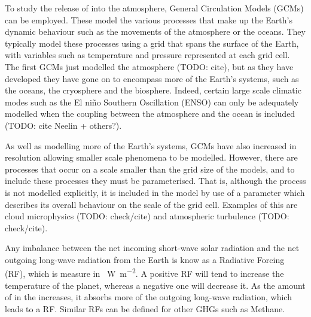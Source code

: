 \documentclass{article}
\newif\ifsubsection
\begin{document}
\ifsubsection
\subsection{General Circulation Models}
\fi
To study the release of  into the atmosphere, General Circulation Models (GCMs) can be employed. These model the various processes that make up the Earth's dynamic behaviour such as the movements of the atmosphere or the oceans. They typically model these processes using a grid that spans the surface of the Earth, with variables such as temperature and pressure represented at each grid cell. The first GCMs just modelled the atmosphere (TODO: cite), but as they have developed they have gone on to encompass more of the Earth's systems, such as the oceans, the cryosphere and the biosphere. Indeed, certain large scale climatic modes such as the El ni{\~n}o Southern Oscillation (ENSO) can only be adequately modelled when the coupling between the atmosphere and the ocean is included (TODO: cite Neelin + others?). 

As well as modelling more of the Earth's systems, GCMs have also increased in resolution allowing smaller scale phenomena to be modelled. However, there are processes that occur on a scale smaller than the grid size of the models, and to include these processes they must be parameterised. That is, although the process is not modelled explicitly, it is included in the model by use of a parameter which describes its overall behaviour on the scale of the grid cell. Examples of this are cloud microphysics (TODO: check/cite) and atmospheric turbulence (TODO: check/cite).

\ifsubsection
\subsection{Radiative forcing and feedbacks}
\fi
Any imbalance between the net incoming short-wave solar radiation and the net outgoing long-wave radiation from the Earth is know as a Radiative Forcing (RF), which is measure in \SI{}{W.m^{-2}}. A positive RF will tend to increase the temperature of the planet, whereas a negative one will decrease it. As the amount of  in the increases, it absorbs more of the outgoing long-wave radiation, which leads to a RF. Similar RFs can be defined for other GHGs such as Methane.
\end{document}
